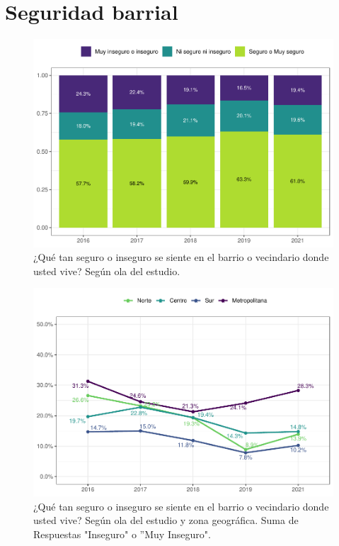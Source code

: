 \documentclass[
  12pt,
  openany]{book}
\begin{document}
\hypertarget{seguridad-barrial}{%
\section{Seguridad barrial}\label{seguridad-barrial}}

\begin{figure}

{\centering \includegraphics{reporte-elsoc_files/figure-latex/seguri-ola-1} 

}

\caption{¿Qué tan seguro o inseguro se siente en el barrio o vecindario donde usted vive? Según ola del estudio.}\label{fig:seguri-ola}
\end{figure}

\begin{figure}

{\centering \includegraphics{reporte-elsoc_files/figure-latex/seguri-zona-1} 

}

\caption{¿Qué tan seguro o inseguro se siente en el barrio o vecindario donde usted vive? Según ola del estudio y zona geográfica. Suma de Respuestas "Inseguro" o ”Muy Inseguro".}\label{fig:seguri-zona}
\end{figure}
\end{document}
